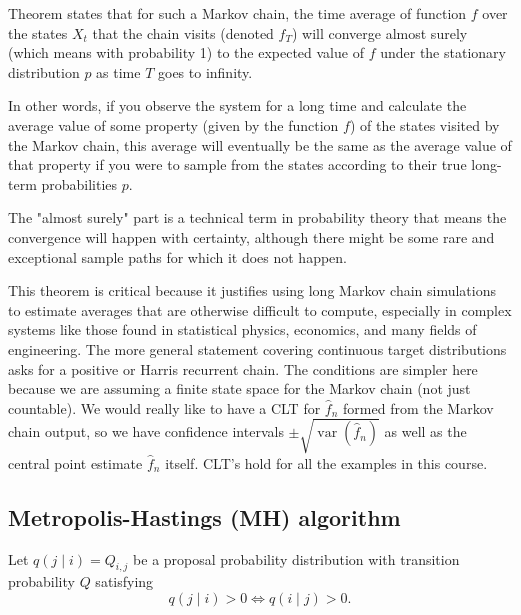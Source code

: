\documentclass{article}
\begin{document}
Theorem states that for such a Markov chain, the time average of function \( f \) over the states \( X_t \) that the chain visits (denoted \( \hat{f}_T \)) will converge almost surely (which means with probability 1) to the expected value of \( f \) under the stationary distribution \( p \) as time \( T \) goes to infinity.

In other words, if you observe the system for a long time and calculate the average value of some property (given by the function \( f \)) of the states visited by the Markov chain, this average will eventually be the same as the average value of that property if you were to sample from the states according to their true long-term probabilities \( p \).

The "almost surely" part is a technical term in probability theory that means the convergence will happen with certainty, although there might be some rare and exceptional sample paths for which it does not happen.

This theorem is critical because it justifies using long Markov chain simulations to estimate averages that are otherwise difficult to compute, especially in complex systems like those found in statistical physics, economics, and many fields of engineering.
\newline
The more general statement covering continuous target distributions asks for a positive or Harris recurrent chain. The conditions are simpler here because we are assuming a finite state space for the Markov chain (not just countable).
We would really like to have a CLT for $\hat{f}_n$ formed from the Markov chain output, so we have confidence intervals $\pm \sqrt{\operatorname{var}\left(\hat{f}_n\right)}$ as well as the central point estimate $\hat{f}_n$ itself. CLT's hold for all the examples in this course. 

\subsection{Metropolis-Hastings (MH) algorithm}
Let $q(j \mid i)=Q_{i, j}$ be a proposal probability distribution with transition probability $Q$ satisfying
$$
q(j \mid i)>0 \Leftrightarrow q(i \mid j)>0 .
$$
\end{document}
